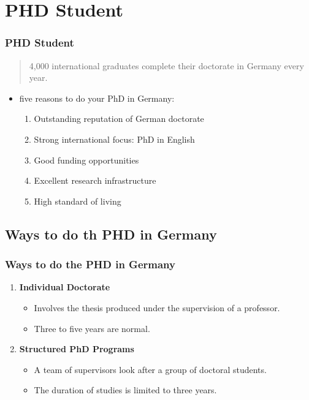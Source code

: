 \documentclass[9pt, compress]{beamer}
\begin{document}
	\section{PHD Student }
	\begin{frame} 
		\frametitle{PHD Student}
		\begin{quotation}
			4,000 international graduates complete their doctorate in Germany every year.
		\end{quotation}
		\begin{itemize}
			\item five reasons to do your PhD in Germany:
			\begin{enumerate}
				\setcounter{enumi}{0}
				\item Outstanding reputation of German doctorate
				\item Strong international focus: PhD in English
				\item Good funding opportunities 
				\item Excellent research infrastructure
				\item High standard of living			
			\end{enumerate}
		\end{itemize}
	\end{frame}
	\subsection{Ways to do th PHD in Germany}
	\begin{frame} 
		\frametitle{Ways to do the PHD in Germany}
		\begin{enumerate}
			\setcounter{enumi}{0}
			\item \textbf{Individual Doctorate}
			\begin{itemize}
				\item Involves the thesis produced under the supervision of a professor. 
				\item Three to five years are normal. 
			\end{itemize}
			\item \textbf{Structured PhD Programs}
			\begin{itemize}
				\item A team of supervisors look after a group of doctoral students. 
				\item The duration of  studies is  limited to three years.
			\end{itemize}
		\end{enumerate} 
	\end{frame}
\end{document}
